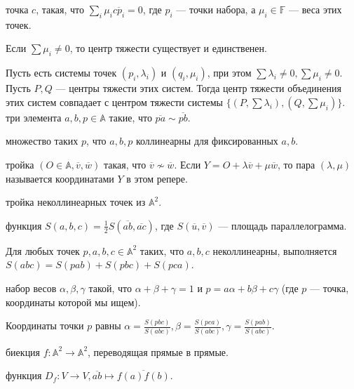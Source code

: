 \documentclass[12pt,a4paper]{article}
\begin{document}
 точка $c$, такая, что $\sum_i\mu_i\overline{cp_i}=0$, где $p_i$ --- точки набора, а $\mu_i\in\mathbb F$ --- веса этих точек.

\theorem Если $\sum \mu_i\neq 0$, то центр тяжести существует и единственен.

\lemma Пусть есть системы точек $(p_i,\lambda_i)$ и $(q_i,\mu_i)$, при этом $\sum\lambda_i\neq 0,\sum\mu_i\neq 0$. Пусть $P,Q$ --- центры тяжести этих систем. Тогда центр тяжести объединения этих систем совпадает с центром тяжести системы $\{(P,\sum \lambda_i),(Q,\sum\mu_i)\}$.\\

 три элемента $a,b,p\in \mathbb A$ такие, что $\overline{pa}\sim \overline{pb}$.

 множество таких $p$, что $a,b,p$ коллинеарны для фиксированных $a,b$.

 тройка $(O\in\mathbb A,\overline{v},\overline{w})$ такая, что $\overline{v}\not\sim \overline{w}$. Если $Y=O+\lambda\overline{v}+\mu\overline{w}$, то пара $(\lambda,\mu)$ называется координатами $Y$ в этом репере.

 тройка неколлинеарных точек из $\mathbb A^2$.

 функция $S(a,b,c)=\frac{1}{2}S(\overline{ab},\overline{ac})$, где $S(\overline{u},\overline{v})$ --- площадь параллелограмма.

\lemma Для любых точек $p,a,b,c\in \mathbb A^2$ таких, что $a,b,c$ неколлинеарны, выполняется $S(abc)=S(pab)+S(pbc)+S(pca)$.

 набор весов $\alpha,\beta,\gamma$ такой, что $\alpha+\beta+\gamma=1$ и $p=a\alpha+b\beta+c\gamma$ (где $p$ --- точка, координаты которой мы ищем).

\lemma Координаты точки $p$ равны $\alpha=\frac{S(pbc)}{S(abc)},\beta=\frac{S(pca)}{S(abc)},\gamma=\frac{S(pab)}{S(abc)}$.\\

\vskip10pt

 биекция $f:\mathbb A^2\to \mathbb A^2$, переводящая прямые в прямые.

 функция $D_f:V\to V,\overline{ab}\mapsto  \overline{f(a)f(b)}$.

\end{document}
